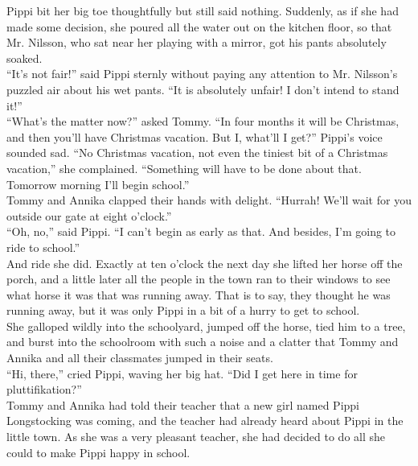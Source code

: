 \documentclass{standard}
\begin{document}
Pippi bit her big toe thoughtfully but still said nothing. Suddenly, as if she had made some decision, she poured all the water out on the kitchen floor, so that Mr. Nilsson, who sat near her playing with a mirror, got his pants absolutely soaked.\\

“It’s not fair!” said Pippi sternly without paying any attention to Mr. Nilsson’s puzzled air about his wet pants. “It is absolutely unfair! I don’t intend to stand it!”\\

“What’s the matter now?” asked Tommy. “In four months it will be Christmas, and then you’ll have Christmas vacation. But I, what’ll I get?” Pippi’s voice sounded sad. “No Christmas vacation, not even the tiniest bit of a Christmas vacation,” she complained. “Something will have to be done about that. Tomorrow morning I’ll begin school.”\\

Tommy and Annika clapped their hands with delight. “Hurrah! We’ll wait for you outside our gate at eight o’clock.”\\

“Oh, no,” said Pippi. “I can’t begin as early as that. And besides, I’m going to ride to school.”\\

And ride she did. Exactly at ten o’clock the next day she lifted her horse off the porch, and a little later all the people in the town ran to their windows to see what horse it was that was running away. That is to say, they thought he was running away, but it was only Pippi in a bit of a hurry to get to school.\\

She galloped wildly into the schoolyard, jumped off the horse, tied him to a tree, and burst into the schoolroom with such a noise and a clatter that Tommy and Annika and all their classmates jumped in their seats.\\

“Hi, there,” cried Pippi, waving her big hat. “Did I get here in time for pluttifikation?”\\

Tommy and Annika had told their teacher that a new girl named Pippi Longstocking was coming, and the teacher had already heard about Pippi in the little town. As she was a very pleasant teacher, she had decided to do all she could to make Pippi happy in school.\\
\end{document}
